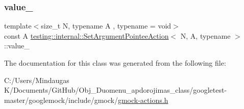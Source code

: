 \mbox{\label{structtesting_1_1internal_1_1_set_argument_pointee_action_a15e2027e9cfaac539a9db12f766188ab}} 
\subsubsection{\texorpdfstring{value\_}{value\_}}
{\footnotesize\ttfamily template$<$size\+\_\+t N, typename A , typename  = void$>$ \\
const A \mbox{\hyperlink{structtesting_1_1internal_1_1_set_argument_pointee_action}{testing\+::internal\+::\+Set\+Argument\+Pointee\+Action}}$<$ N, A, typename $>$\+::value\+\_\+\hspace{0.3cm}{\ttfamily [private]}}



The documentation for this class was generated from the following file\+:\begin{DoxyCompactItemize}
\item 
C\+:/\+Users/\+Mindaugas K/\+Documents/\+Git\+Hub/\+Obj\+\_\+\+Duomenu\+\_\+apdorojimas\+\_\+class/googletest-\/master/googlemock/include/gmock/\mbox{\hyperlink{googletest-master_2googlemock_2include_2gmock_2gmock-actions_8h}{gmock-\/actions.\+h}}\end{DoxyCompactItemize}
